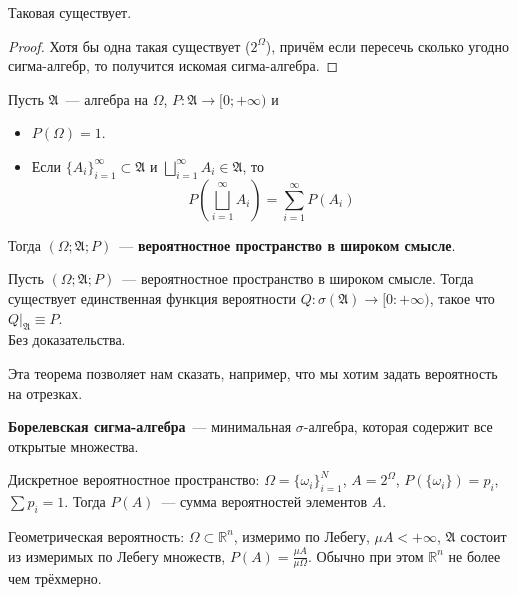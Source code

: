 \documentclass{article}
\newcommand{\A}{{\mathfrak A}}
\begin{document}
    \begin{claim}
        Таковая существует.
    \end{claim}
    \begin{proof}
        Хотя бы одна такая существует ($2^\Omega$), причём если пересечь сколько угодно сигма-алгебр, то получится искомая сигма-алгебра.
    \end{proof}
    \begin{definition}
        Пусть $\A$~--- алгебра на $\Omega$, $P\colon\A\to[0;+\infty)$ и
        \begin{itemize}
            \item $P(\Omega)=1$.
            \item Если $\{A_i\}_{i=1}^\infty\subset\A$ и $\bigsqcup\limits_{i=1}^\infty A_i\in\A$, то
            $$
            P\left(\bigsqcup\limits_{i=1}^\infty A_i\right)=\sum\limits_{i=1}^\infty P(A_i)
            $$
        \end{itemize}
        Тогда $(\Omega;\A;P)$~--- \textbf{вероятностное пространство в широком смысле}.
    \end{definition}
    \begin{theorem}
        Пусть $(\Omega;\A;P)$~--- вероятностное пространство в широком смысле. Тогда существует единственная функция вероятности $Q\colon\sigma(\A)\to[0:+\infty)$, такое что $Q\Big|_{\A}\equiv P$.\\
        Без доказательства.
    \end{theorem}
    \begin{remark}
        Эта теорема позволяет нам сказать, например, что мы хотим задать вероятность на отрезках.
    \end{remark}
    \begin{definition}
        \textbf{Борелевская сигма-алгебра}~--- минимальная $\sigma$-алгебра, которая содержит все открытые множества.
    \end{definition}
    \begin{example}
        Дискретное вероятностное пространство: $\Omega=\{\omega_i\}_{i=1}^N$, $A=2^\Omega$, $P(\{\omega_i\})=p_i$, $\sum p_i=1$. Тогда $P(A)$~--- сумма вероятностей элементов $A$.
    \end{example}
    \begin{example}
        Геометрическая вероятность: $\Omega\subset\mathbb R^n$, измеримо по Лебегу, $\mu A<+\infty$, $\A$ состоит из измеримых по Лебегу множеств, $P(A)=\frac{\mu A}{\mu\Omega}$. Обычно при этом $\mathbb R^n$ не более чем трёхмерно.
    \end{example}
\end{document}
